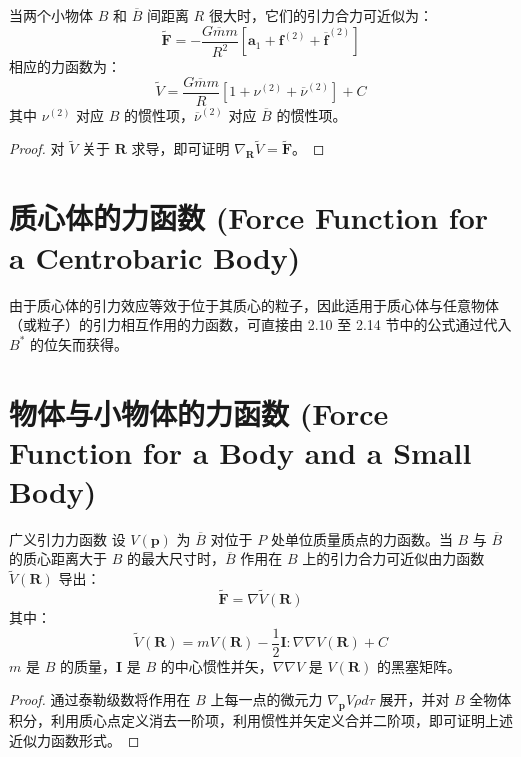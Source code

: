 当两个小物体 \(B\) 和 \(\overline{B}\) 间距离 \(R\) 很大时，它们的引力合力可近似为：
\begin{equation}
\widetilde{\mathbf{F}} = -\frac{G\overline{m}m}{R^2}\left[\mathbf{a}_1 + \mathbf{f}^{(2)} + \overline{\mathbf{f}}^{(2)}\right] \tag{1}
\end{equation}
相应的力函数为：
\begin{equation}
\widetilde{V} = \frac{G\overline{m}m}{R}\left[1 + \nu^{(2)} + \overline{\nu}^{(2)}\right] + C \tag{3}
\end{equation}
其中 \(\nu^{(2)}\) 对应 \(B\) 的惯性项，\(\overline{\nu}^{(2)}\) 对应 \(\overline{B}\) 的惯性项。
\begin{proof}
对 \(\widetilde{V}\) 关于 \(\mathbf{R}\) 求导，即可证明 \(\nabla_{\mathbf{R}}\widetilde{V} = \widetilde{\mathbf{F}}\)。
\end{proof}

\section{质心体的力函数 (Force Function for a Centrobaric Body)}

由于质心体的引力效应等效于位于其质心的粒子，因此适用于质心体与任意物体（或粒子）的引力相互作用的力函数，可直接由 2.10 至 2.14 节中的公式通过代入 \(B^*\) 的位矢而获得。

\section{物体与小物体的力函数 (Force Function for a Body and a Small Body)}

\begin{myTheorem}{广义引力力函数}
设 \(V(\mathbf{p})\) 为 \(\overline{B}\) 对位于 \(P\) 处单位质量质点的力函数。当 \(B\) 与 \(\overline{B}\) 的质心距离大于 \(B\) 的最大尺寸时，\(\overline{B}\) 作用在 \(B\) 上的引力合力可近似由力函数 \(\widetilde{V}(\mathbf{R})\) 导出：
\begin{equation}
\widetilde{\mathbf{F}} = \nabla \widetilde{V}(\mathbf{R}) \tag{1}
\end{equation}
其中：
\begin{equation}
\widetilde{V}(\mathbf{R}) = m V(\mathbf{R}) - \frac{1}{2}\mathbf{I}: \nabla\nabla V(\mathbf{R}) + C \tag{2}
\end{equation}
\(m\) 是 \(B\) 的质量，\(\mathbf{I}\) 是 \(B\) 的中心惯性并矢，\(\nabla\nabla V\) 是 \(V(\mathbf{R})\) 的黑塞矩阵。
\end{myTheorem}
\begin{proof}
通过泰勒级数将作用在 \(B\) 上每一点的微元力 \(\nabla_{\mathbf{p}}V\rho d\tau\) 展开，并对 \(B\) 全物体积分，利用质心点定义消去一阶项，利用惯性并矢定义合并二阶项，即可证明上述近似力函数形式。
\end{proof}

